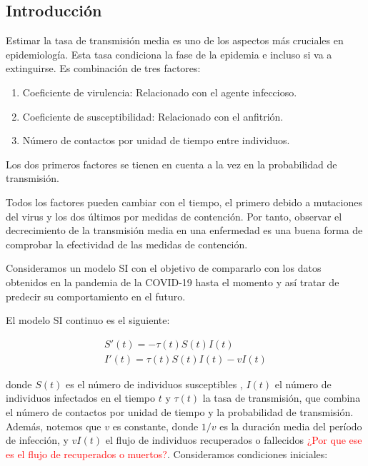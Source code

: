 \subsection{Introducción}

Estimar la tasa de transmisión media es uno de los aspectos más cruciales en epidemiología. Esta tasa condiciona la fase de la epidemia e incluso si va a extinguirse. Es combinación de tres factores:

\begin{enumerate}
\item Coeficiente de virulencia: Relacionado con el agente infeccioso.
\item Coeficiente de susceptibilidad: Relacionado con el anfitrión.
\item Número de contactos por unidad de tiempo entre individuos.
\end{enumerate}

Los dos primeros factores se tienen en cuenta a la vez en la probabilidad de transmisión.

Todos los factores pueden cambiar con el tiempo, el primero debido a mutaciones del virus y los dos últimos por medidas de contención. Por tanto, observar el decrecimiento de la transmisión media en una enfermedad es una buena forma de comprobar la efectividad de las medidas de contención.

Consideramos un modelo SI con el objetivo de compararlo con los datos obtenidos en la pandemia de la COVID-19 hasta el momento y así tratar de predecir su comportamiento en el futuro.

El modelo SI continuo es el siguiente:

\begin{equation}
\label{eqn: SI_cont}
\begin{aligned}
S'(t) = -\tau (t)S(t)I(t) \\
I'(t) = \tau (t)S(t)I(t) -vI(t)
\end{aligned}
\end{equation}

donde $S(t)$ es el número de individuos susceptibles , $I(t)$ el número de individuos infectados en el tiempo $t$ y $\tau (t)$ la tasa de transmisión, que combina el número de contactos por unidad de tiempo y la probabilidad de transmisión. Además, notemos que $v$ es constante, donde $1/v$ es la duración media del período de infección, y $vI(t)$ el flujo de individuos recuperados o fallecidos \textcolor{red}{¿Por que ese es el flujo de recuperados o muertos?}. Consideramos condiciones iniciales:

